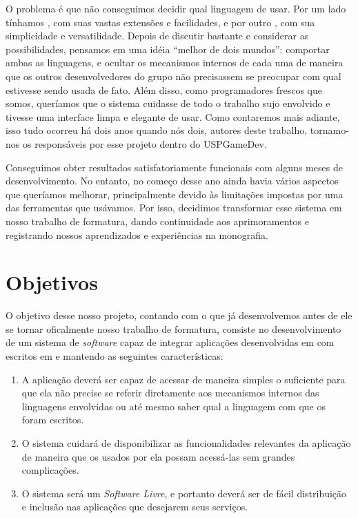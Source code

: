 O problema é que não conseguimos decidir qual linguagem de \script{} usar.
Por um lado tínhamos , com suas vastas extensões e facilidades, e
por outro , com sua simplicidade e versatilidade. Depois de discutir
bastante e considerar as possibilidades, pensamos em uma idéia ``melhor de dois
mundos'': comportar ambas as linguagens, e ocultar os mecanismos internos de
cada uma de maneira que os outros desenvolvedores do grupo não precisassem se
preocupar com qual estivesse sendo usada de fato. Além disso, como programadores
frescos que somos, queríamos que o sistema cuidasse de todo o trabalho sujo
envolvido e tivesse uma interface limpa e elegante de usar. Como contaremos mais
adiante, isso tudo ocorreu há dois anos quando nós dois, autores deste
trabalho, tornamo-nos os responsáveis por esse projeto dentro do USPGameDev.

Conseguimos obter resultados satisfatoriamente funcionais com alguns meses de
desenvolvimento. No entanto, no começo desse ano ainda havia vários aspectos que
queríamos melhorar, principalmente devido às limitações impostas por uma das
ferramentas que usávamos. Por isso, decidimos transformar esse sistema em nosso
trabalho de formatura, dando continuidade aos aprimoramentos e registrando
nossos aprendizados e experiências na monografia.

\section{Objetivos}
\label{cap:intr:objetivos}

  O objetivo desse nosso projeto, contando com o que já desenvolvemos antes de
  ele se tornar oficalmente nosso trabalho de formatura, consiste no
  desenvolvimento de um sistema de \textit{software} capaz de integrar
  aplicações desenvolvidas em \CXX{} com  escritos em  e
   mantendo as seguintes características:
  
  \begin{enumerate}

    \item A aplicação deverá ser capaz de acessar  de maneira simples
          o suficiente para que ela não precise se referir diretamente aos
          mecanismos internos das linguagens envolvidas ou até mesmo saber qual a
          linguagem com que os  foram escritos.
    \item O sistema cuidará de disponibilizar as funcionalidades relevantes da
          aplicação de maneira que os  usados por ela possam acessá-las
          sem grandes complicações.
    \item O sistema será um \textit{Software Livre}, e portanto deverá ser de
          fácil distribuição e inclusão nas aplicações que desejarem seus
          serviços.

  \end{enumerate}


